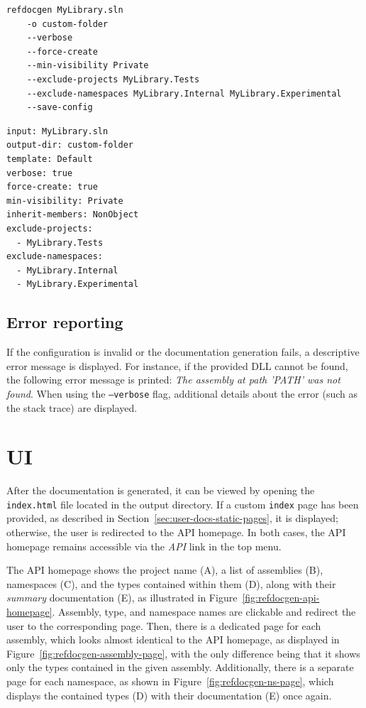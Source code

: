 \begin{listing}[H]
\begin{lstlisting}[language=bash]
refdocgen MyLibrary.sln 
    -o custom-folder
    --verbose 
    --force-create 
    --min-visibility Private 
    --exclude-projects MyLibrary.Tests 
    --exclude-namespaces MyLibrary.Internal MyLibrary.Experimental 
    --save-config
\end{lstlisting}
\caption{Example command line configuration}
\label{lst:cmd-save-config}
\end{listing}

\begin{listing}[H]
\begin{lstlisting}[language=bash]
input: MyLibrary.sln
output-dir: custom-folder
template: Default
verbose: true
force-create: true
min-visibility: Private
inherit-members: NonObject
exclude-projects:
  - MyLibrary.Tests
exclude-namespaces:
  - MyLibrary.Internal
  - MyLibrary.Experimental
\end{lstlisting}
\caption{Example YAML configuration file}
\label{lst:cmd-line-yaml}
\end{listing}

\subsection*{Error reporting}

If the configuration is invalid or the documentation generation fails, a descriptive error message is displayed.
For instance, if the provided DLL cannot be found, the following error message is printed: \textit{The assembly at path 'PATH' was not found}.
When using the \texttt{--verbose} flag, additional details about the error (such as the stack trace) are displayed.

\section{UI}

After the documentation is generated, it can be viewed by opening the \texttt{index.html} file located in the output directory. 
If a custom \texttt{index} page has been provided, as described in Section~\ref{sec:user-docs-static-pages}, it is displayed; otherwise, the user is redirected to the API homepage. 
In both cases, the API homepage remains accessible via the \textit{API} link in the top menu.

The API homepage shows the project name (A), a list of assemblies (B), namespaces (C), and the types contained within them (D), along with their \textit{summary} documentation (E), as illustrated in Figure~\ref{fig:refdocgen-api-homepage}.
Assembly, type, and namespace names are clickable and redirect the user to the corresponding page.
Then, there is a dedicated page for each assembly, which looks almost identical to the API homepage, as displayed in Figure~\ref{fig:refdocgen-assembly-page}, with the only difference being that it shows only the types contained in the given assembly.
Additionally, there is a separate page for each namespace, as shown in Figure~\ref{fig:refdocgen-ns-page}, which displays the contained types (D) with their documentation (E) once again.

